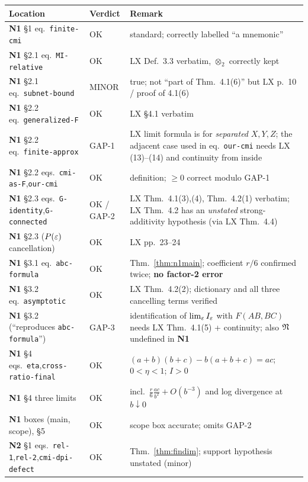 \documentclass[11pt]{article}
\newcommand{\Fmi}{F}
\newcommand{\NI}{\textbf{N1}}
\newcommand{\NII}{\textbf{N2}}
\newcommand{\loc}[1]{{\small\texttt{#1}}}
\newcommand{\1}{\mathbf 1}
\newcommand{\CMI}{I}
\begin{document}
\begin{center}\small
\begin{longtable}{@{}p{}p{}p{}@{}}
\toprule
\textbf{Location} & \textbf{Verdict} & \textbf{Remark}\\
\midrule\endhead
\NI{} \S1 eq.~\loc{finite-cmi} & OK & standard; correctly labelled ``a mnemonic''\\
\NI{} \S2.1 eq.~\loc{MI-relative} & OK & LX Def.~3.3 verbatim, $\otimes_2$ correctly kept\\
\NI{} \S2.1 eq.~\loc{subnet-bound} & MINOR & true; not ``part of Thm.~4.1(6)'' but LX p.~10 / proof of 4.1(6)\\
\NI{} \S2.2 eq.~\loc{generalized-F} & OK & LX \S4.1 verbatim\\
\NI{} \S2.2 eq.~\loc{finite-approx} & GAP-1 & LX limit formula is for \emph{separated} $X,Y,Z$; the adjacent case used in eq.~\loc{our-cmi} needs LX (13)--(14) and continuity from inside\\
\NI{} \S2.2 eqs.~\loc{cmi-as-F},\loc{our-cmi} & OK & definition; $\ge0$ correct modulo GAP-1\\
\NI{} \S2.3 eqs.~\loc{G-identity},\loc{G-connected} & OK / GAP-2 & LX Thm.~4.1(3),(4), Thm.~4.2(1) verbatim; LX Thm.~4.2 has an \emph{unstated} strong-additivity hypothesis (via LX Thm.~4.4)\\
\NI{} \S2.3 ($P(\varepsilon)$ cancellation) & OK & LX pp.~23--24\\
\NI{} \S3.1 eq.~\loc{abc-formula} & OK & Thm.~\ref{thm:n1main}; coefficient $r/6$ confirmed twice; \textbf{no factor-2 error}\\
\NI{} \S3.2 eq.~\loc{asymptotic} & OK & LX Thm.~4.2(2); dictionary and all three cancelling terms verified\\
\NI{} \S3.2 (``reproduces \loc{abc-formula}'') & GAP-3 & identification of $\lim_\varepsilon I_\varepsilon$ with $\Fmi(AB,BC)$ needs LX Thm.~4.1(5) + continuity; also $\mathfrak N$ undefined in \NI\\
\NI{} \S4 eqs.~\loc{eta},\loc{cross-ratio-final} & OK & $(a{+}b)(b{+}c)-b(a{+}b{+}c)=ac$; $0<\eta<1$; $\CMI>0$\\
\NI{} \S4 three limits & OK & incl.\ $\frac r6\frac{ac}{b^2}+O(b^{-3})$ and log divergence at $b\downarrow0$\\
\NI{} boxes (main, scope), \S5 & OK & scope box accurate; omits GAP-2\\
\midrule
\NII{} \S1 eqs.~\loc{rel-1},\loc{rel-2},\loc{cmi-dpi-defect} & OK & Thm.~\ref{thm:findim}; support hypothesis unstated (minor)\\

\end{longtable}
\end{center}
\end{document}
